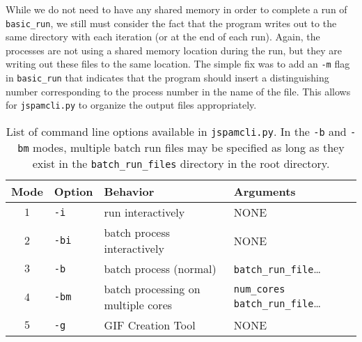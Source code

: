 While we do not need to have any shared memory in order to complete a
 run of \texttt{basic\_run}, we still must consider the fact
that the program writes out to the same directory with each iteration (or at the
end of each run).
Again, the processes are not using a shared memory
location during the run, but they are writing out these files to the same location.
The simple fix was to add an \texttt{-m} flag in \texttt{basic\_run} that
indicates that the program should insert a distinguishing number corresponding
to the process number in the name of the file. This allows for
\texttt{jspamcli.py} to organize the output files appropriately.
%
\begin{table}[h!]
    \centering
    \begin{tabular}{clll}
    \toprule
    Mode & Option       & Behavior                        & Arguments \\
    \midrule
    $1$ & \texttt{-i}  & run interactively               & NONE          \\
    $2$ & \texttt{-bi} & batch process interactively     & NONE          \\
    $3$ & \texttt{-b}  & batch process (normal)%
        & \texttt{batch\_run\_file}\ldots\\
    $4$ & \texttt{-bm} & batch processing on multiple cores & \texttt{num\_cores}
    \texttt{batch\_run\_file}\ldots\\
    $5$ & \texttt{-g}  & GIF Creation Tool               & NONE          \\
    \bottomrule
    \end{tabular}
    \caption[\texttt{jspamcli.py} command line options]%
    {List of command line options
        available in \texttt{jspamcli.py}. In the \texttt{-b} and \texttt{-bm}
        modes, multiple batch run files may be specified as long as they exist in
        the \texttt{batch\_run\_files} directory in the root directory.
    }
    \label{table:jspamcli_table}
\end{table}
%



